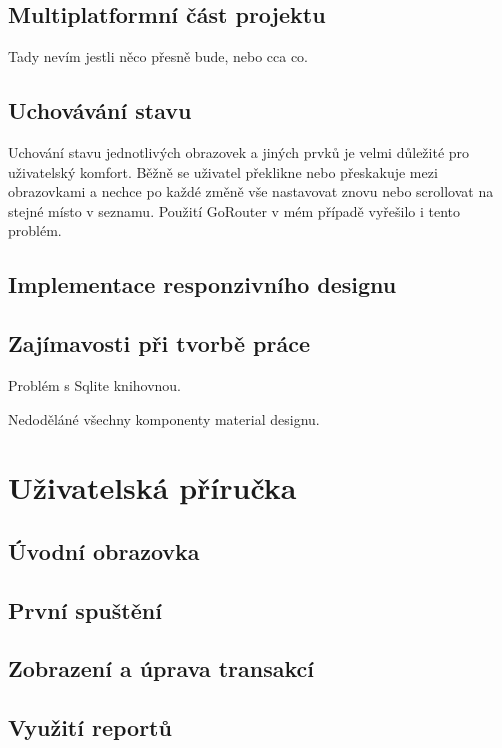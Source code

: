 \documentclass[
  biblatex,
  figures=true,
  tables=false,
  glossaries,
  index
]{kidiplom}
\begin{document}
\subsection{Multiplatformní část projektu}
Tady nevím jestli něco přesně bude, nebo cca co.

\subsection{Uchovávání stavu}
Uchování stavu jednotlivých obrazovek a jiných prvků je velmi důležité pro uživatelský komfort. Běžně se uživatel překlikne nebo přeskakuje mezi obrazovkami a nechce po každé změně vše nastavovat znovu nebo scrollovat na stejné místo v seznamu. Použití GoRouter v mém případě vyřešilo i tento problém. 

\subsection{Implementace responzivního designu}

\subsection{Zajímavosti při tvorbě práce}

Problém s Sqlite knihovnou.

Nedoděláné všechny komponenty material designu.

\section{Uživatelská příručka}

\subsection{Úvodní obrazovka}

\subsection{První spuštění}

\subsection{Zobrazení a úprava transakcí}

\subsection{Využití reportů}
\end{document}
